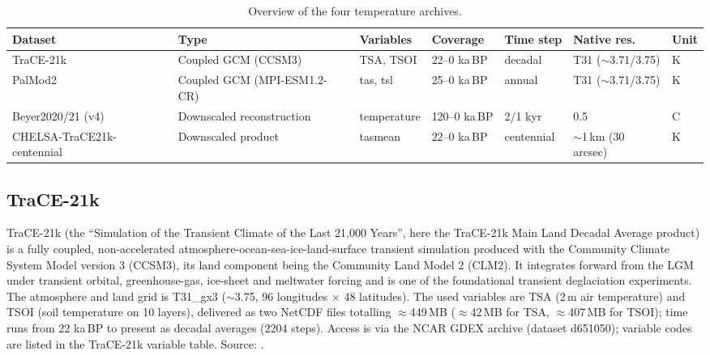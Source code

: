 \documentclass{isprs}
\newcommand{\dg}{\textdegree}
\newcommand{\degC}{\textdegree C}
\newcommand{\kaBP}{ka\,BP}
\begin{document}
\begin{table}[t]
\centering
\small
\begin{tabular}{lllllll}
\toprule
Dataset           			& Type                        & Variables   & Coverage     & Time step  & Native res.           	& Unit \\
\midrule
TraCE-21k         			& Coupled GCM (CCSM3)         & TSA, TSOI   & 22--0 \kaBP  & decadal    & T31 ($\sim$3.71/3.75\dg)   	& K \\
PalMod2           			& Coupled GCM (MPI-ESM1.2-CR) & tas, tsl    & 25--0 \kaBP  & annual     & T31 ($\sim$3.71/3.75\dg)   	& K \\
Beyer2020/21 (v4)			& Downscaled reconstruction   & temperature & 120--0 \kaBP & 2/1 kyr    & 0.5\dg{}              	& \degC \\
CHELSA-TraCE21k-centennial  & Downscaled product          & tasmean     & 22--0 \kaBP  & centennial & $\sim$1\,km (30\,arcsec) 	& K \\
\bottomrule
\end{tabular}
\caption{Overview of the four temperature archives.}
\label{tab:overview}
\end{table}

\subsection{TraCE-21k}
TraCE-21k (the ``Simulation of the Transient Climate of the Last 21,000 Years'', here the TraCE-21k Main Land Decadal Average product) is a fully coupled, non-accelerated atmosphere-ocean-sea-ice-land-surface transient simulation produced with the Community Climate System Model version 3 (CCSM3), its land component being the Community Land Model 2 (CLM2). It integrates forward from the LGM under transient orbital, greenhouse-gas, ice-sheet and meltwater forcing and is one of the foundational transient deglaciation experiments. The atmosphere and land grid is T31\_gx3 ($\sim$3.75\dg, 96 longitudes $\times$ 48 latitudes). The used variables are TSA (2\,m air temperature) and TSOI (soil temperature on 10 layers), delivered as two NetCDF files totalling $\approx$449\,MB ($\approx$42\,MB for TSA, $\approx$407\,MB for TSOI); time runs from 22 \kaBP{} to present as decadal averages (2204 steps). Access is via the NCAR GDEX archive (dataset d651050); variable codes are listed in the TraCE-21k variable table. Source: \cite{trace21k_data} \cite{trace_vars}.
\end{document}
